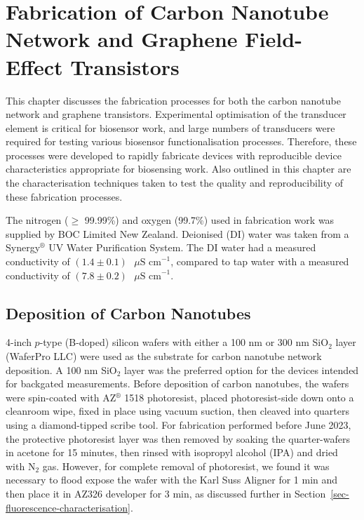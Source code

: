 \documentclass[
  a4paper,
]{scrbook}
\begin{document}

\hypertarget{sec-fabrication}{%
\chapter{Fabrication of Carbon Nanotube Network and Graphene
Field-Effect Transistors}\label{sec-fabrication}}

This chapter discusses the fabrication processes for both the carbon
nanotube network and graphene transistors. Experimental optimisation of
the transducer element is critical for biosensor work, and large numbers
of transducers were required for testing various biosensor
functionalisation processes. Therefore, these processes were developed
to rapidly fabricate devices with reproducible device characteristics
appropriate for biosensing work. Also outlined in this chapter are the
characterisation techniques taken to test the quality and
reproducibility of these fabrication processes.

The nitrogen (\(\geq\) 99.99\%) and oxygen (99.7\%) used in fabrication
work was supplied by BOC Limited New Zealand. Deionised (DI) water was
taken from a Synergy\(^\circledR\) UV Water Purification System. The DI
water had a measured conductivity of
\((1.4\pm0.1)\textrm{ } \mu \textrm{S cm}^{-1}\), compared to tap water
with a measured conductivity of
\((7.8\pm0.2)\textrm{ } \mu \textrm{S cm}^{-1}\).

\hypertarget{sec-dep-carbon-nanotubes}{%
\section{Deposition of Carbon
Nanotubes}\label{sec-dep-carbon-nanotubes}}

4-inch \(p\)-type (B-doped) silicon wafers with either a 100 nm or 300
nm SiO\(_2\) layer (WaferPro LLC) were used as the substrate for carbon
nanotube network deposition. A 100 nm SiO\(_2\) layer was the preferred
option for the devices intended for backgated measurements. Before
deposition of carbon nanotubes, the wafers were spin-coated with
AZ\(^\circledR\) 1518 photoresist, placed photoresist-side down onto a
cleanroom wipe, fixed in place using vacuum suction, then cleaved into
quarters using a diamond-tipped scribe tool. For fabrication performed
before June 2023, the protective photoresist layer was then removed by
soaking the quarter-wafers in acetone for 15 minutes, then rinsed with
isopropyl alcohol (IPA) and dried with N\(_2\) gas. However, for
complete removal of photoresist, we found it was necessary to flood
expose the wafer with the Karl Suss Aligner for 1 min and then place it
in AZ326 developer for 3 min, as discussed further in
Section~\ref{sec-fluorescence-characterisation}.
\end{document}
